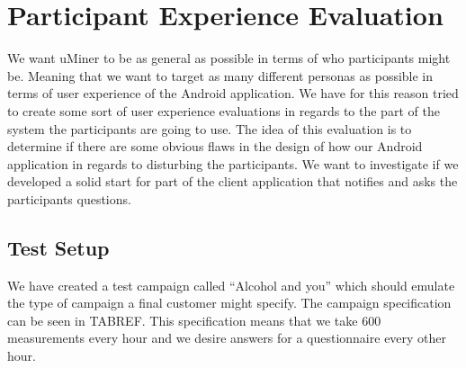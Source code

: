 \section{Participant Experience Evaluation}
\label{sec:participant_experience_evaluation}

We want uMiner to be as general as possible in terms of who participants might be. Meaning that we want to target as many different personas as possible in terms of user experience of the Android application. We have for this reason tried to create some sort of user experience evaluations in regards to the part of the system the participants are going to use. The idea of this evaluation is to determine if there are some obvious flaws in the design of how our Android application in regards to disturbing the participants. We want to investigate if we developed a solid start for part of the client application that notifies and asks the participants questions.

\subsection{Test Setup}
\label{sub:test_setup}

We have created a test campaign called ``Alcohol and you'' which should emulate the type of campaign a final customer might specify. The campaign specification can be seen in TABREF. This specification means that we take 600 measurements every hour and we desire answers for a questionnaire every other hour.

